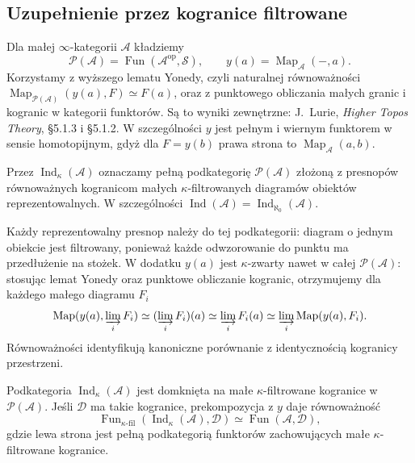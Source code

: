 \subsection{Uzupełnienie przez kogranice filtrowane}

Dla małej $\infty$-kategorii $\mathcal A$ kładziemy
\[
 \mathcal P(\mathcal A)=\operatorname{Fun}(\mathcal A^{\mathrm{op}},\mathcal S),
 \qquad y(a)=\operatorname{Map}_{\mathcal A}(-,a).
\]
Korzystamy z wyższego lematu Yonedy, czyli naturalnej równoważności $\operatorname{Map}_{\mathcal P(\mathcal A)}(y(a),F)\simeq F(a)$, oraz z punktowego obliczania małych granic i kogranic w kategorii funktorów. Są to wyniki zewnętrzne: J.~Lurie, \emph{Higher Topos Theory}, \S5.1.3 i \S5.1.2. W szczególności $y$ jest pełnym i wiernym funktorem w sensie homotopijnym, gdyż dla $F=y(b)$ prawa strona to $\operatorname{Map}_{\mathcal A}(a,b)$.

\begin{definicja}\label{cat:def:infty-ind}
Przez $\operatorname{Ind}_\kappa(\mathcal A)$ oznaczamy pełną podkategorię $\mathcal P(\mathcal A)$ złożoną z presnopów równoważnych kogranicom małych $\kappa$-filtrowanych diagramów obiektów reprezentowalnych. W szczególności $\operatorname{Ind}(\mathcal A)=\operatorname{Ind}_{\aleph_0}(\mathcal A)$.
\end{definicja}

Każdy reprezentowalny presnop należy do tej podkategorii: diagram o jednym obiekcie jest filtrowany, ponieważ każde odwzorowanie do punktu ma przedłużenie na stożek. W dodatku $y(a)$ jest $\kappa$-zwarty nawet w całej $\mathcal P(\mathcal A)$: stosując lemat Yonedy oraz punktowe obliczanie kogranic, otrzymujemy dla każdego małego diagramu $F_i$
\[
 \operatorname{Map}(y(a),\varinjlim_iF_i)
 \simeq(\varinjlim_iF_i)(a)
 \simeq\varinjlim_i F_i(a)
 \simeq\varinjlim_i\operatorname{Map}(y(a),F_i).
\]
Równoważności identyfikują kanoniczne porównanie z identycznością kogranicy przestrzeni.

\begin{twierdzenie}\label{cat:thm:infty-ind-universal}
Podkategoria $\operatorname{Ind}_\kappa(\mathcal A)$ jest domknięta na małe $\kappa$-filtrowane kogranice w $\mathcal P(\mathcal A)$. Jeśli $\mathcal D$ ma takie kogranice, prekompozycja z $y$ daje równoważność
\[
 \operatorname{Fun}_{\kappa\text{-fil}}(\operatorname{Ind}_\kappa(\mathcal A),\mathcal D)
 \simeq \operatorname{Fun}(\mathcal A,\mathcal D),
\]
gdzie lewa strona jest pełną podkategorią funktorów zachowujących małe $\kappa$-filtrowane kogranice.
\end{twierdzenie}

